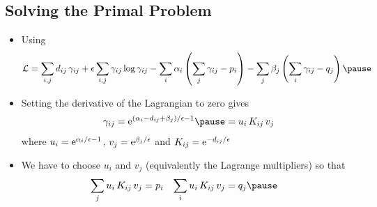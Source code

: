 \begin{slide}
\section[-2]{Solving the Primal Problem}

\begin{PauseHighLight}
  \begin{itemize}
  \item Using
    {\small
    \begin{align*}
      \mathcal{L} = \sum_{i,j} d_{ij}\,\gamma_{ij} + \epsilon\sum_{i,j}
      \gamma_{ij}\log\gamma_{ij} - \sum_i \alpha_i \bra{\sum_j
      \gamma_{ij} - p_i}  - \sum_j \beta_j \bra{\sum_i
      \gamma_{ij} - q_j}\pause
    \end{align*}}
  \item Setting the derivative of the Lagrangian to zero gives
    \begin{align*}
      \gamma_{ij} = \e{(\alpha_i - d_{ij} + \beta_j)/\epsilon - 1}\pause
       = u_i\,K_{ij}\,v_j
    \end{align*}
    where $u_i=  {\rm e}^{\alpha_i/\epsilon-1}$, $v_j={\rm e}^{\beta_j/\epsilon}$
    and $K_{ij} = {\rm e}^{-d_{ij}/\epsilon}$\pauseb
  \item We have to choose $u_i$ and $v_j$ (equivalently the Lagrange
    multipliers) so that
    \begin{align*}
      \sum_j u_i\,K_{ij}\,v_j &= p_i & \sum_i u_i\,K_{ij}\,v_j &= q_j\pause
    \end{align*}
  \end{itemize}
\end{PauseHighLight}

\end{slide}



